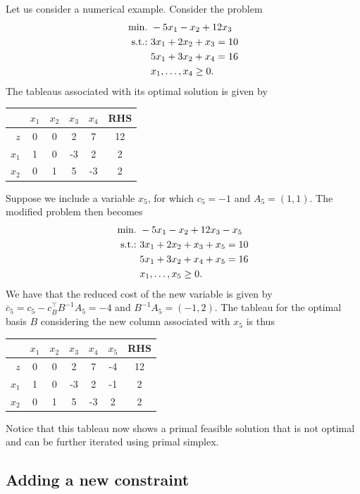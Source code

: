 Let us consider a numerical example. Consider the problem
%
\begin{align*}
	\mathop{\text{min.~}} & -5x_1 -x_2 + 12 x_3 \\
	\mathop{\text{s.t.:~}}   & 3x_1 + 2x_2 + x_3 = 10 \\
	& 5x_1 + 3x_2 + x_4 = 16 \\
	& x_1, \dots, x_4 \geq 0.
\end{align*}
%
The tableaus associated with its optimal solution is given by

\begin{center}
	\begin{tabular}{r|cccc|c} 
	   &$x_1$ & $x_2$ & $x_3$ & $x_4$& RHS \\ \hline	
	   $z$ & 0 & 0 & 2 & 7 & 12\\ \hline
	   $x_1$ & 1 & 0 & -3 & 2 & 2\\
	   $x_2$ & 0 & 1 & 5 & -3 & 2            
	\end{tabular}
\end{center}

Suppose we include a variable $x_5$, for which $c_5 = -1$ and $A_5 = (1,1)$. The modified problem then becomes
%
\begin{align*}
	\mathop{\text{min.~}} & -5x_1 -x_2 + 12 x_3 -x_5 	 \\
	\mathop{\text{s.t.:~}}   & 3x_1 + 2x_2 + x_3 + x_5 = 10 \\
	& 5x_1 + 3x_2 + x_4 + x_5 = 16 \\
	& x_1, \dots, x_5 \geq 0.
\end{align*}
%
We have that the reduced cost of the new variable is given by $\overline{c}_5 = c_5 - c_B^\top B^{-1}A_5 = -4$ and $B^{-1}A_5 = (-1,2)$. The tableau for the optimal basis $B$ considering the new column associated with $x_5$ is thus

\begin{center}
	\begin{tabular}{r|ccccc|c} 
	   &$x_1$ & $x_2$ & $x_3$ & $x_4$& $x_5$ & RHS \\ \hline	
	   $z$ & 0 & 0 & 2 & 7 & -4 & 12   \\ \hline
	   $x_1$ & 1 & 0 & -3 & 2 & -1 & 2 \\
	   $x_2$ & 0 & 1 & 5 & -3 & 2 & 2	            
	\end{tabular}
\end{center}

Notice that this tableau now shows a primal feasible solution that is not optimal and can be further iterated using primal simplex.


\subsection{Adding a new constraint}

